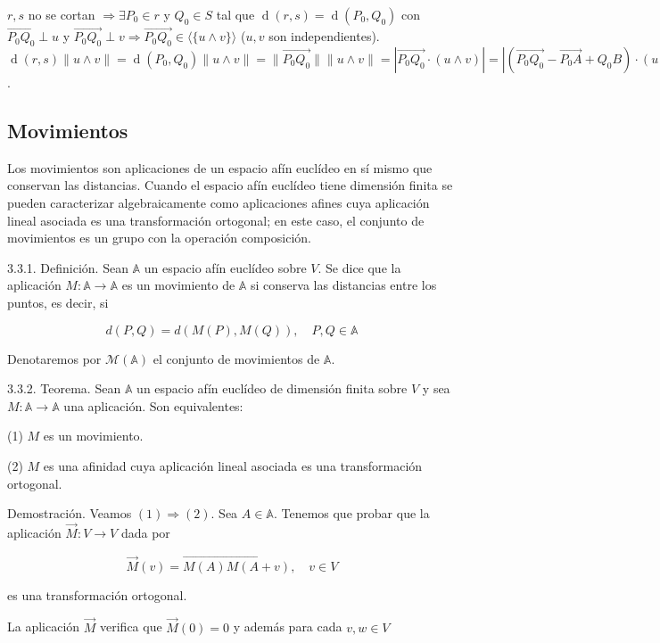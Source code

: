 \documentclass[12pt, a4paper, ones, notitlepage, openany,titlepage]{article}
\newcommand{\distancia}[1]{\operatorname{d}(#1)}
\begin{document}
$r,s$ no se cortan $\Longrightarrow \exists P_0 \in r$ y $Q_0 \in S$ tal que $\distancia{r,s} = \distancia{P_0,Q_0}$ con $\overrightarrow{P_0 Q_0} \perp u$ y $\overrightarrow{P_0 Q_0} \perp v \Longrightarrow \overrightarrow{P_0 Q_0} \in \langle \{u \wedge v\} \rangle$ ($u,v$ son independientes). $\distancia{r,s} \|u \wedge v\| = \distancia{P_0,Q_0} \|u \wedge v\| = \|\overrightarrow{P_0 Q_0}\| \|u \wedge v\| = |\overrightarrow{P_0 Q_0} \cdot (u \wedge v)| = |(\overrightarrow{P_0 Q_0} - \overrightarrow{P_0 A} + Q_0 B) \cdot (u \wedge v)| = |\overrightarrow{AB} \cdot (u \wedge v)| = |(\overrightarrow{AB} u v)$.

\subsection{Movimientos}
Los movimientos son aplicaciones de un espacio afín euclídeo en sí mismo que conservan las distancias. Cuando el espacio afín euclídeo tiene dimensión finita se pueden caracterizar algebraicamente como aplicaciones afines cuya aplicación lineal asociada es una transformación ortogonal; en este caso, el conjunto de movimientos es un grupo con la operación composición.

3.3.1. Definición. Sean $\mathbb{A}$ un espacio afín euclídeo sobre $V$. Se dice que la aplicación $M: \mathbb{A} \rightarrow \mathbb{A}$ es un movimiento de $\mathbb{A}$ si conserva las distancias entre los puntos, es decir, si

$$
d(P, Q)=d(M(P), M(Q)), \quad P, Q \in \mathbb{A}
$$

Denotaremos por $\mathcal{M}(\mathbb{A})$ el conjunto de movimientos de $\mathbb{A}$.

3.3.2. Teorema. Sean $\mathbb{A}$ un espacio afín euclídeo de dimensión finita sobre $V$ y sea $M: \mathbb{A} \rightarrow \mathbb{A}$ una aplicación. Son equivalentes:

(1) $M$ es un movimiento.

(2) $M$ es una afinidad cuya aplicación lineal asociada es una transformación ortogonal.

Demostración. Veamos $(1) \Rightarrow(2)$. Sea $A \in \mathbb{A}$. Tenemos que probar que la aplicación $\vec{M}: V \rightarrow V$ dada por

$$
\vec{M}(v)=\overrightarrow{M(A) M(A+v)}, \quad v \in V
$$

es una transformación ortogonal.

La aplicación $\vec{M}$ verifica que $\vec{M}(0)=0$ y además para cada $v, w \in V$
\end{document}
